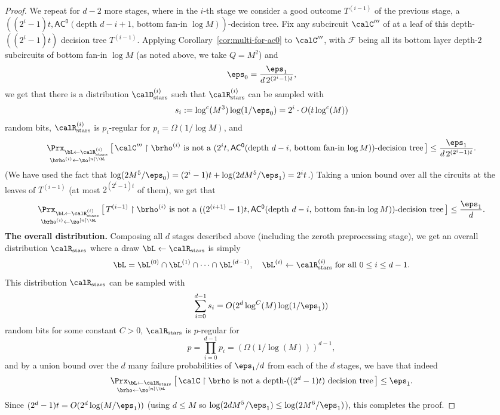 \documentclass{toc}
\theoremstyle{plain}
\newcommand{\acz}{\mathsf{AC^0}}
\newcommand{\uhr}{\upharpoonright}
\newcommand{\stars}{\mathrm{stars}}
\begin{document}
\begin{proof}
 We repeat for $d-2$ more stages, where in the $i$-th stage we consider a good outcome $T^{(i-1)}$ of the previous stage, a $((2^{i}-1)t, \acz(\text{depth $d-i+1$, bottom fan-in $\log M$}))$-decision tree.  Fix any subcircuit $\calC'''$ of at a leaf of this depth-$((2^i-1)t)$ decision tree $T^{(i-1)}$.  Applying Corollary~\ref{cor:multi-for-ac0} to $\calC'''$, with $\mathscr{F}$ being all its bottom layer depth-$2$ subcircuits of bottom fan-in $\log M$ (as noted above, we take $Q = M^2$) and 
\[ \eps_0 = \frac{\eps_1}{d\,2^{(2^{i}-1)t}}, \] 
we get that there is a distribution $\calD_{\stars}^{(i)}$ such that $\calR_\stars^{(i)}$ can be sampled with 
\[ s_i := \log^c(M^3) \log(1/\eps_0) = 2^i \cdot O(t\log^c(M)) \] 
random bits, $\calR_\stars^{(i)}$ is $p_i$-regular for $p_i = \Omega(1/\log M)$, and
\[ \mathop{\Prx_{\bL\leftarrow\calR_\stars^{(i)}}}_{\brho^{(i)}\leftarrow\zo^{[n]\setminus \bL}}\big[\,\calC''' \uhr \brho^{(i)} \text{~is not a $(2^i t, \acz(\text{depth $d-i$, bottom fan-in $\log M$}))$-decision tree}\, \big] \le \frac{\eps_1}{d\,2^{(2^{i}-1)t}}. \]  
(We have used the fact that $\log(2M^{5}/\eps_0) = (2^i-1)t + \log(2dM^{5}/\eps_1) = 2^it$.)  Taking a union bound over all the circuits at the leaves of $T^{(i-1)}$ (at most $2^{(2^i-1)t}$ of them), we get that 
\[ \mathop{\Prx_{\bL\leftarrow\calR_\stars^{(i)}}}_{\brho^{(i)}\leftarrow\zo^{[n]\setminus \bL}}\big[\,T^{(i-1)} \uhr \brho^{(i)} \text{~is not a $((2^{(i+1)}-1)t, \acz(\text{depth $d-i$, bottom fan-in $\log M$}))$-decision tree}\, \big] \le \frac{\eps_1}{d}. \] 
{\bf The overall distribution.} Composing all $d$ stages described above (including the zeroth preprocessing stage), we get an overall distribution $\calR_\stars$ where a draw $\bL \leftarrow \calR_\stars$ is simply 
\[ \bL = \bL^{(0)} \cap \bL^{(1)} \cap \cdots \cap \bL^{(d-1)}, \quad \bL^{(i)} \leftarrow \calR_\stars^{(i)} \text{~for all $0\le i \le d-1$}. \]
This distribution $\calR_\stars$ can be sampled with 
\[ \sum_{i=0}^{d-1} s_i = O( 2^{d}  \log^C(M)\log(1/\eps_1)) \]
random bits for some constant $C > 0$, $\calR_\stars$ is $p$-regular for 
\[ p = \prod_{i=0}^{d-1} p_i = (\Omega(1/\log(M)))^{d-1}, \] 
and by a union bound over the $d$ many failure probabilities of $\eps_1/d$ from each of the $d$ stages, we have that indeed 
\[ \mathop{\Prx_{\bL\leftarrow\calR_\stars}}_{\brho\leftarrow\zo^{[n]\setminus \bL}}\big[\,\text{$\calC \uhr \brho$ is not a depth-$((2^d-1)t)$ decision tree}\,\big] \le \eps_1. \]
Since $(2^d-1)t = O( 2^d \log(M/\eps_1))$ (using $d \leq M$ so $\log(2dM^5/\eps_1) \leq \log(2M^6/\eps_1)$), this completes the proof. 
\end{proof} 
\end{document}
